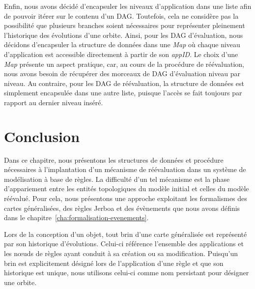 Enfin, nous avons décidé d'encapsuler les niveaux d'application dans une liste
afin de pouvoir itérer sur le contenu d'un DAG. %
Toutefois, cela ne considère pas la possibilité que plusieurs branches soient
nécessaires pour représenter pleinement l'historique des évolutions d'une
orbite. %
Ainsi, pour les DAG d'évaluation, nous décidons d'encapsuler la structure de
données dans une \textit{Map} où chaque niveau d'application est accessible
directement à partir de son \textit{appID}. %
Le choix d'une \textit{Map} présente un aspect pratique, car, au cours de la procédure de réévaluation, nous avons besoin de récupérer des morceaux de DAG d'évaluation niveau par niveau. %
Au contraire, pour les DAG de réévaluation, la structure de données est
simplement encapsulée dans une autre liste, puisque l'accès se fait toujours par
rapport au dernier niveau inséré. %



\section{Conclusion}
\label{sec:reevaluation-base-regles-conclusion}



Dans ce chapitre, nous présentons les structures de données et procédure
nécessaires à l'implantation d'un mécanisme de réévaluation dans un système de
modélisation à base de règles. %
La difficulté d'un tel mécanisme est la phase d'appariement entre les entités
topologiques du modèle initial et celles du modèle réévalué. %
Pour cela, nous présentons une approche exploitant les formalismes des cartes
généralisées, des règles Jerboa et des évènements que nous avons définis dans le
chapitre~\ref{cha:formalisation-evenements}. %

Lors de la conception d'un objet, tout brin d'une carte généralisée est
représenté par son historique d'évolutions. %
Celui-ci référence l'ensemble des applications et les n\oe uds de règles ayant
conduit à sa création ou sa modification. %
Puisqu'un brin est explicitement désigné lors de l'application d'une règle et
que son historique est unique, nous utilisons celui-ci comme nom persistant pour
désigner une orbite. %


